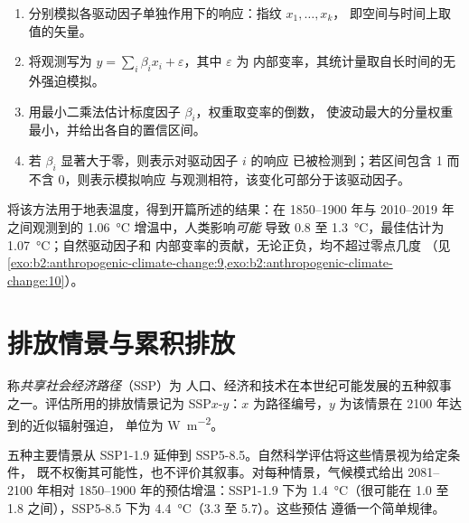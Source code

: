 \begin{method}[最优指纹法]\label{met:b2:anthropogenic-climate-change:fingerprinting}
\begin{enumerate}
  \item 分别模拟各驱动因子单独作用下的响应：指纹 $x_1, \dots, x_k$，
        即空间与时间上取值的矢量。
  \item 将观测写为 $y = \sum_i \beta_i x_i + \varepsilon$，其中 $\varepsilon$ 为
        内部变率，其统计量取自长时间的无外强迫模拟。
  \item 用最小二乘法估计标度因子 $\beta_i$，权重取变率的倒数，
        使波动最大的分量权重最小，并给出各自的置信区间。
  \item 若 $\beta_i$ 显著大于零，则表示对驱动因子 $i$ 的响应
        已被检测到；若区间包含 1 而不含 0，则表示模拟响应
        与观测相符，该变化可部分于该驱动因子。
\end{enumerate}
\end{method}

将该方法用于地表温度，得到开篇所述的结果：在
1850--1900 年与 2010--2019 年之间观测到的 \qty{1.06}{\celsius} 增温中，人类影响\emph{可能}
导致 0.8 至 \qty{1.3}{\celsius}，最佳估计为 \qty{1.07}{\celsius}；自然驱动因子和
内部变率的贡献，无论正负，均不超过零点几度
（见\cref{exo:b2:anthropogenic-climate-change:9,exo:b2:anthropogenic-climate-change:10}）。

\section{排放情景与累积排放}\label{sec:b2:anthropogenic-climate-change:scenarios}

\begin{definition}[共享社会经济路径]\label{def:b2:anthropogenic-climate-change:ssp}
称\emph{共享社会经济路径}（SSP）为
人口、经济和技术在本世纪可能发展的五种叙事之一。评估所用的排放情景记为
SSP$x$-$y$：$x$ 为路径编号，$y$ 为该情景在 2100 年达到的近似辐射强迫，
单位为 \unit{W.m^{-2}}。
\end{definition}

五种主要情景从 SSP1-1.9 延伸到 SSP5-8.5。自然科学评估将这些情景视为给定条件，
既不权衡其可能性，也不评价其叙事。对每种情景，气候模式给出
2081--2100 年相对 1850--1900 年的预估增温：SSP1-1.9 下为 \qty{1.4}{\celsius}（很可能在 1.0 至
1.8 之间），SSP5-8.5 下为 \qty{4.4}{\celsius}（3.3 至 5.7）。这些预估
遵循一个简单规律。

